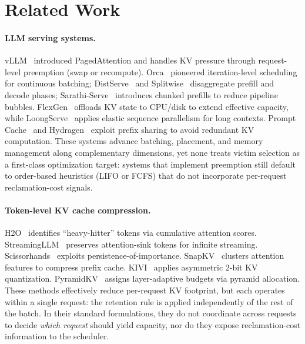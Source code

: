 \documentclass[sigconf,nonacm]{acmart}
\begin{document}
\section{Related Work}\label{sec:related}

\paragraph{LLM serving systems.}
vLLM~\cite{Kwon2023} introduced PagedAttention and handles KV pressure through
request-level preemption (swap or recompute).
Orca~\cite{Yu2022} pioneered iteration-level scheduling for continuous
batching; DistServe~\cite{Zhong2024} and Splitwise~\cite{Patel2024}
disaggregate prefill and decode phases;
Sarathi-Serve~\cite{Agrawal2024sarathiserve} introduces chunked prefills to
reduce pipeline bubbles.
FlexGen~\cite{Sheng2023flexgen} offloads KV state to CPU/disk to extend
effective capacity, while LoongServe~\cite{Wu2024loongserve} applies elastic
sequence parallelism for long contexts.
Prompt Cache~\cite{Gim2024} and Hydragen~\cite{Juravsky2024} exploit prefix
sharing to avoid redundant KV computation.
These systems advance batching, placement, and memory management along
complementary dimensions, yet none treats victim selection as a first-class
optimization target: systems that implement preemption still default to
order-based heuristics (LIFO or FCFS) that do not incorporate per-request
reclamation-cost signals.

\paragraph{Token-level KV cache compression.}
H2O~\cite{Zhang2023h2o} identifies ``heavy-hitter'' tokens via
cumulative attention scores.
Streaming\-LLM~\cite{Xiao2024} preserves attention-sink tokens
for infinite streaming.
Scissorhands~\cite{Liu2023scissorhands} exploits persistence-of-importance.
SnapKV~\cite{Li2024snapkv} clusters attention features to compress prefix
cache.
KIVI~\cite{Liu2024kivi} applies asymmetric 2-bit KV quantization.
PyramidKV~\cite{Zhang2025pyramidkv} assigns layer-adaptive budgets via pyramid
allocation.
These methods effectively reduce per-request KV footprint, but each operates
within a single request: the retention rule is applied independently of the
rest of the batch.  In their standard formulations, they do not coordinate
across requests to decide \emph{which request} should yield capacity, nor do
they expose reclamation-cost information to the scheduler.
\end{document}

